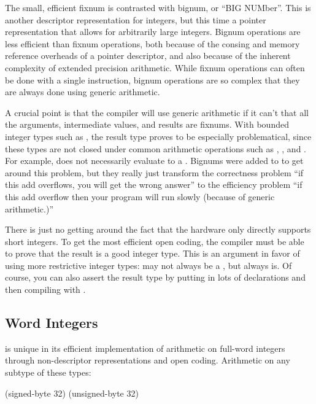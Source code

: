 The small, efficient fixnum is contrasted with bignum, or ``BIG
NUMber''.  This is another descriptor representation for integers, but
this time a pointer representation that allows for arbitrarily large
integers.  Bignum operations are less efficient than fixnum
operations, both because of the consing and memory reference overheads
of a pointer descriptor, and also because of the inherent complexity
of extended precision arithmetic.  While fixnum operations can often
be done with a single instruction, bignum operations are so complex
that they are always done using generic arithmetic.

A crucial point is that the compiler will use generic arithmetic if it
can't  that all the arguments, intermediate values, and
results are fixnums.  With bounded integer types such as
, the result type proves to be especially problematical,
since these types are not closed under common arithmetic operations
such as \code{+}, \code{-}, \code{*} and \code{/}.  For example,
 does not necessarily evaluate to a
.  Bignums were added to \llisp{} to get around this
problem, but they really just transform the correctness problem ``if
this add overflows, you will get the wrong answer'' to the efficiency
problem ``if this add  overflow then your program will run
slowly (because of generic arithmetic.)''

There is just no getting around the fact that the hardware only
directly supports short integers.  To get the most efficient open
coding, the compiler must be able to prove that the result is a good
integer type.  This is an argument in favor of using more restrictive
integer types:  may not always be a
, but  always
is.  Of course, you can also assert the result type by putting in lots
of  declarations and then compiling with 
.


\subsection{Word Integers}
\label{word-integers}

\python{} is unique in its efficient implementation of arithmetic
on full-word integers through non-descriptor representations and open coding.
Arithmetic on any subtype of these types:

\begin{lisp}
(signed-byte 32)
(unsigned-byte 32)
\end{lisp}

